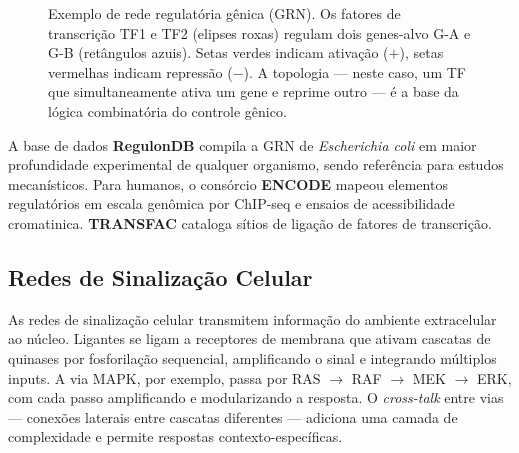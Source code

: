 \begin{figure}[htbp]
\centering
{}
\caption{Exemplo de rede regulatória gênica (GRN). Os fatores de transcrição TF1 e TF2 (elipses roxas) regulam dois genes-alvo G-A e G-B (retângulos azuis). Setas verdes indicam ativação ($+$), setas vermelhas indicam repressão ($-$). A topologia --- neste caso, um TF que simultaneamente ativa um gene e reprime outro --- é a base da lógica combinatória do controle gênico.}
\label{fig:03-grn}
\end{figure}

A base de dados \textbf{RegulonDB} compila a GRN de \textit{Escherichia coli} em
maior profundidade experimental de qualquer organismo, sendo referência para estudos
mecanísticos. Para humanos, o consórcio \textbf{ENCODE} mapeou elementos regulatórios
em escala genômica por ChIP-seq e ensaios de acessibilidade cromatinica. \textbf{TRANSFAC}
cataloga sítios de ligação de fatores de transcrição.

\subsection{Redes de Sinalização Celular}

As redes de sinalização celular transmitem informação do ambiente extracelular ao núcleo.
Ligantes se ligam a receptores de membrana que ativam cascatas de quinases por fosforilação
sequencial, amplificando o sinal e integrando múltiplos inputs. A via MAPK, por exemplo,
passa por RAS $\to$ RAF $\to$ MEK $\to$ ERK, com cada passo amplificando e modularizando
a resposta. O \emph{cross-talk} entre vias --- conexões laterais entre cascatas diferentes
--- adiciona uma camada de complexidade e permite respostas contexto-específicas.

